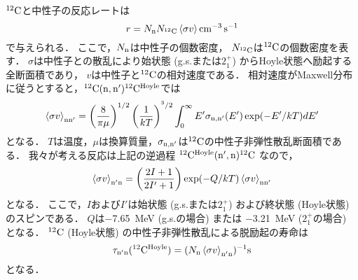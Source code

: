 \documentclass[../master]{subfiles}
\begin{document}
${}^{12}{\rm C}$と中性子の反応レートは
\begin{equation}
  r = N_{\rm n}N_{{}^{12}{\rm C}}\braket{\sigma v} \si{\per\cubic\centi\metre\per\second}
  \label{eq::r}
\end{equation}
で与えられる．
ここで，$N_{{\rm n}}$は中性子の個数密度，
$N_{{}^{12}{\rm C}}$は${}^{12}{\rm C}$の個数密度を表す．
$\sigma$は中性子との散乱により始状態 (g.s.または$2_{1}^{+}$) からHoyle状態へ励起する全断面積であり，
$v$は中性子と${}^{12}{\rm C}$の相対速度である．
相対速度がMaxwell分布に従うとすると，${}^{12}{\rm C}({\rm n},{\rm n'}){}^{12}{\rm C}^{{\rm Hoyle}}$では
\begin{equation}
  \braket{\sigma v}_{\rm nn'} =
  \left(\frac{8}{\pi\mu}\right)^{1/2}\left(\frac{1}{kT}\right)^{^3/2}
  \int^{\infty}_{0}E'\sigma_{\rm n,n'}(E')\exp(-E'/kT)dE'
  \label{eq::sigmann'}
\end{equation}
となる．
$T$は温度，$\mu$は換算質量，$\sigma_{\rm n,n'}$は${}^{12}{\rm C}$の中性子非弾性散乱断面積である．
我々が考える反応は上記の逆過程 ${}^{12}{\rm C}^{{\rm Hoyle}}({\rm n',n}){}^{12}{\rm C}$ なので，
\begin{equation}
  \braket{\sigma v}_{\rm n'n} = \left(\frac{2I+1}{2I'+1}\right)
  \exp(-Q/kT)\braket{\sigma v}_{\rm nn'}
  \label{eq::sigman'n}
\end{equation}
となる．
ここで，$I$および$I'$は始状態 (g.s.または$2_{1}^{+}$)
および終状態 (Hoyle状態) のスピンである．
$Q$は\SI{-7.65}{\mega\electronvolt} (g.s.の場合) または
\SI{-3.21}{\mega\electronvolt} ($2_{1}^{+}$の場合) となる．
${}^{12}{\rm C}$ (Hoyle状態) の中性子非弾性散乱による脱励起の寿命は
\begin{equation}
  \tau_{\rm n'n}({}^{12}{\rm C}^{{\rm Hoyle}}) =
  (N_{\rm n}\braket{\sigma v}_{\rm n'n})^{-1} {\rm s}
  \label{eq::tau}
\end{equation}
となる．
\end{document}
